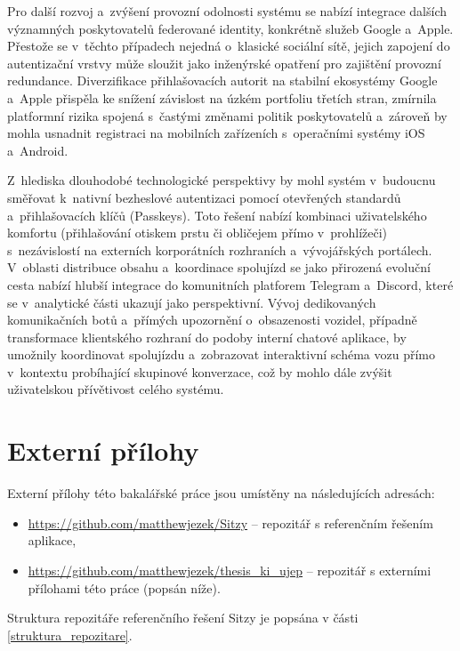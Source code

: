 \documentclass[male,czech,api_bc]{kitheses}
\begin{document}
Pro další rozvoj a~zvýšení provozní odolnosti systému se nabízí integrace dalších významných poskytovatelů federované identity, konkrétně služeb Google a~Apple. Přestože se v~těchto případech nejedná o~klasické sociální sítě, jejich zapojení do autentizační vrstvy může sloužit jako inženýrské opatření pro zajištění provozní redundance. Diverzifikace přihlašovacích autorit na stabilní ekosystémy Google a~Apple přispěla ke snížení závislost na úzkém portfoliu třetích stran, zmírnila platformní rizika spojená s~častými změnami politik poskytovatelů a~zároveň by mohla usnadnit registraci na mobilních zařízeních s~operačními systémy iOS a~Android.

Z~hlediska dlouhodobé technologické perspektivy by mohl systém v~budoucnu směřovat k~nativní bezheslové autentizaci pomocí otevřených standardů a~přihlašovacích klíčů (Passkeys). Toto řešení nabízí kombinaci uživatelského komfortu (přihlašování otiskem prstu či obličejem přímo v~prohlížeči) s~nezávislostí na externích korporátních rozhraních a~vývojářských portálech. V~oblasti distribuce obsahu a~koordinace spolujízd se jako přirozená evoluční cesta nabízí hlubší integrace do komunitních platforem Telegram a~Discord, které se v~analytické části ukazují jako perspektivní. Vývoj dedikovaných komunikačních botů a~přímých upozornění o~obsazenosti vozidel, případně transformace klientského rozhraní do podoby interní chatové aplikace, by umožnily koordinovat spolujízdu a~zobrazovat interaktivní schéma vozu přímo v~kontextu probíhající skupinové konverzace, což by mohlo dále zvýšit uživatelskou přívětivost celého systému.

\sloppy
\printbibliography[title=Seznam použitých zdrojů]

\appendix

\chapter{Externí přílohy}
\label{sec:ep}

Externí přílohy této bakalářské práce jsou umístěny na následujících adresách:
\begin{itemize}
    \item \url{https://github.com/matthewjezek/Sitzy} -- repozitář s referenčním řešením aplikace,
    \item \url{https://github.com/matthewjezek/thesis_ki_ujep} -- repozitář s externími přílohami této práce (popsán níže).
\end{itemize}

Struktura repozitáře referenčního řešení Sitzy je popsána v části \vref{struktura_repozitare}.
\end{document}
